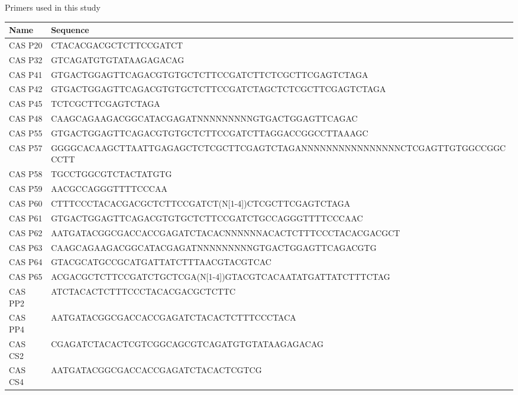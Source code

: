 \begin{supptable}[t]
    \centering
    \caption{Primers used in this study}
      \begin{tabular}{lp{13cm}}
      \toprule
      \textbf{Name} & \textbf{Sequence} \\
      \midrule
      CAS P20 & CTACACGACGCTCTTCCGATCT \\
      CAS P32 & GTCAGATGTGTATAAGAGACAG \\
      CAS P41 & GTGACTGGAGTTCAGACGTGTGCTCTTCCGATCTTCTCGCTTCGAGTCTAGA \\
      CAS P42 & GTGACTGGAGTTCAGACGTGTGCTCTTCCGATCTAGCTCTCGCTTCGAGTCTAGA \\
      CAS P45 & TCTCGCTTCGAGTCTAGA \\
      CAS P48 & CAAGCAGAAGACGGCATACGAGATNNNNNNNNNGTGACTGGAGTTCAGAC \\
      CAS P55 & GTGACTGGAGTTCAGACGTGTGCTCTTCCGATCTTAGGACCGGCCTTAAAGC \\
      CAS P57 & GGGGCACAAGCTTAATTGAGAGCTCTCGCTTCGAGTCTAGANNNNNNNNNNNNNNNNCTCGAGTTGTGGCCGGCCCTT \\
      CAS P58 & TGCCTGGCGTCTACTATGTG \\
      CAS P59 & AACGCCAGGGTTTTCCCAA \\
      CAS P60 & CTTTCCCTACACGACGCTCTTCCGATCT(N[1-4])CTCGCTTCGAGTCTAGA \\
      CAS P61 & GTGACTGGAGTTCAGACGTGTGCTCTTCCGATCTGCCAGGGTTTTCCCAAC \\
      CAS P62 & AATGATACGGCGACCACCGAGATCTACACNNNNNNACACTCTTTCCCTACACGACGCT \\
      CAS P63 & CAAGCAGAAGACGGCATACGAGATNNNNNNNNNGTGACTGGAGTTCAGACGTG \\
      CAS P64 & GTACGCATGCCGCATGATTATCTTTAACGTACGTCAC \\
      CAS P65 & ACGACGCTCTTCCGATCTGCTCGA(N[1-4])GTACGTCACAATATGATTATCTTTCTAG \\
      CAS PP2 & ATCTACACTCTTTCCCTACACGACGCTCTTC \\
      CAS PP4 & AATGATACGGCGACCACCGAGATCTACACTCTTTCCCTACA \\
      CAS CS2 & CGAGATCTACACTCGTCGGCAGCGTCAGATGTGTATAAGAGACAG \\
      CAS CS4 & AATGATACGGCGACCACCGAGATCTACACTCGTCG \\
      \bottomrule
      \end{tabular}%
    \label{tab:cas_tableS1}%
  \end{supptable}%
  
